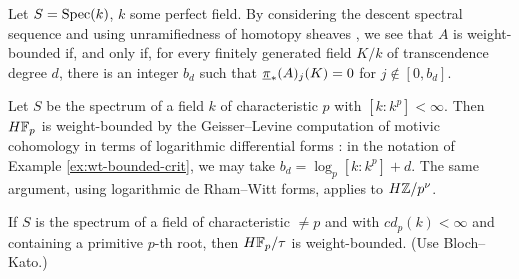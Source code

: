 \documentclass{amsart}
\renewcommand{\NB}[1]{}
\numberwithin{proposition}{section}
\numberwithin{equation}{section}
\begin{document}
\begin{example} \label{ex:wt-bounded-crit}
Let $S=\mathrm{Spec}(k)$, $k$ some perfect field.
By considering the descent spectral sequence and using unramifiedness of homotopy sheaves \cite[Chapter~2]{A1-alg-top}, we see\NB{details?} that $A$ is weight-bounded if, and only if, for every finitely generated field $K/k$ of transcendence degree $d$, there is an integer $b_d$ such that $\underline\pi_*(A)_j(K) = 0$ for $j \not\in[0,b_d]$.
\end{example}

\begin{example} \label{ex:charp-wt-bounded}
Let $S$ be the spectrum of a field $k$ of characteristic $p$ with $[k:k^p] < \infty$.
Then $H\mathbb{F}_p$ is weight-bounded by the Geisser--Levine computation of motivic cohomology in terms of logarithmic differential forms \cite[Theorem~1.1 and Proposition~3.1]{geisser2000k}:
in the notation of Example \ref{ex:wt-bounded-crit}, we may take $b_d = \log_p[k:k^p] + d$.
The same argument, using logarithmic de Rham--Witt forms, applies to $H\mathbb{Z}/p^\nu$.
\end{example}


\begin{example}
If $S$ is the spectrum of a field of characteristic $\ne p$ and with $cd_p(k) < \infty$ and containing a primitive $p$-th root, then $H\mathbb{F}_p/\tau$ is weight-bounded.
(Use Bloch--Kato.)
\end{example}
\end{document}
